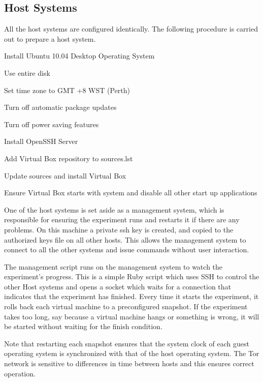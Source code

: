 \subsection{Host Systems}

All the host systems are configured identically. The following procedure is
carried out to prepare a host system.

\begin{itemize*}
  \item Install Ubuntu 10.04 Desktop Operating System
    \begin{itemize*}
      \item Use entire disk
      \item Set time zone to GMT +8 WST (Perth)
    \end{itemize*}
  \item Turn off automatic package updates
  \item Turn off power saving features
  \item Install OpenSSH Server
  \item Add Virtual Box repository to sources.lst
  \item Update sources and install Virtual Box
  \item Ensure Virtual Box starts with system and disable all other start
    up applications
\end{itemize*}

One of the host systems is set aside as a management system, which is
responsible for ensuring the experiment runs and restarts it if there are any
problems. On this machine a private ssh key is created, and copied to the
authorized keys file on all other hosts. This allows the management system to
connect to all the other systems and issue commands without user interaction.

The management script runs on the management system to watch the experiment's
progress. This is a simple Ruby script which uses SSH to control the other Host
systems and opens a socket which waits for a connection that indicates that the
experiment has finished. Every time it starts the experiment, it rolls back
each virtual machine to a preconfigured snapshot. If the experiment takes too
long, say because a virtual machine hangs or something is wrong, it will be
started without waiting for the finish condition.

Note that restarting each snapshot ensures that the system clock of each guest
operating system is synchronized with that of the host operating system. The
Tor network is sensitive to differences in time between hosts and this ensures
correct operation.

